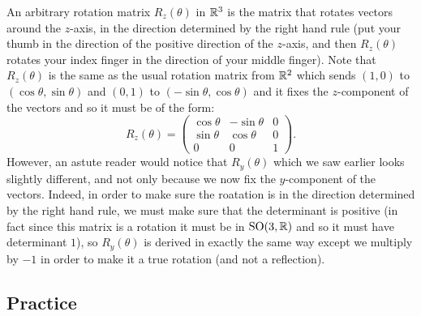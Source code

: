 \documentclass[11pt,a4paper]{article}
\begin{document}
\begin{remark}
  An arbitrary rotation matrix $R_z(\theta)$ in $\mathbb{R}^3$
  is the matrix that rotates vectors around the $z$-axis,
  in the direction determined by the right hand rule
  (put your thumb in the direction of the positive direction of the $z$-axis,
  and then $R_z(\theta)$ rotates your index finger in the direction of your
  middle finger).
  Note that $R_z(\theta)$ is the same as the usual rotation
  matrix from $\mathbb{R}^2$ which sends $(1,0)$ to $(\cos \theta, \sin \theta)$
  and $(0,1)$ to $(-\sin \theta, \cos \theta)$ and it fixes
  the $z$-component of the vectors and so it must be of the form:
  \[
    R_z(\theta) =
    \begin{pmatrix}
      \cos\theta & -\sin\theta & 0 \\
      \sin\theta & \cos\theta & 0 \\
      0 & 0 & 1
    \end{pmatrix}.
  \]
  However, an astute reader would notice that $R_y(\theta)$
  which we saw earlier looks slightly different, and not
  only because we now fix the $y$-component of the vectors.
  Indeed, in order to make sure the roatation is in the direction
  determined by the right hand rule, we must make sure that the
  determinant is positive (in fact since this matrix
  is a rotation it must be in $\mathrm{SO}(3,\mathbb{R})$ and so it must have
  determinant $1$), so $R_y(\theta)$ is derived in exactly the same
  way except we multiply by $-1$ in order to make it a true rotation
  (and not a reflection).
\end{remark}

\subsection{Practice}
\end{document}
